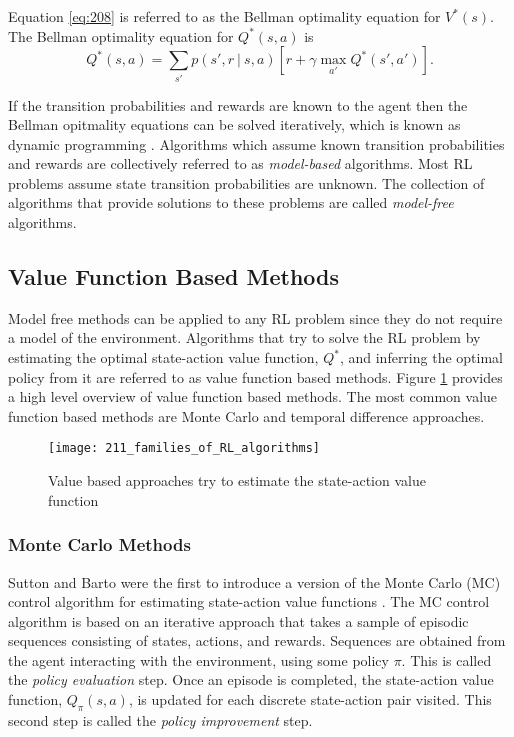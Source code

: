 Equation \ref{eq:208} is referred to as the Bellman optimality equation for $V^*(s)$. The Bellman optimality equation for $Q^*(s,a)$ is
\begin{equation}
	Q^*(s,a) = \sum_{s'} p(s', r \ | \ s, a)[r + \gamma \max_{a'} Q^*(s',a')]. \label{eq:209}
\end{equation}

If the transition probabilities and rewards are known to the agent then the Bellman opitmality equations can be solved iteratively, which is known as dynamic programming \cite{Bellm1957}. Algorithms which assume known transition probabilities and rewards are collectively referred to as \textit{model-based} algorithms. Most RL problems assume state transition probabilities are unknown. The collection of algorithms that provide solutions to these problems are called \textit{model-free} algorithms.


\subsection{Value Function Based Methods}
Model free methods can be applied to any RL problem since they do not require a model of the environment. Algorithms that try to solve the RL problem by estimating the optimal state-action value function, $Q^*$, and inferring the optimal policy from it are referred to as value function based methods. Figure \ref{fig:211_families_of_RL_algorithms} provides a high level overview of value function based methods. The most common value function based methods are Monte Carlo and temporal difference approaches.

\begin{figure}[h]
	\centering
	\texttt{[image: 211\_families\_of\_RL\_algorithms]}
	\caption[RL approaches: Value Based]{Value based approaches try to estimate the state-action value function}
	\label{fig:211_families_of_RL_algorithms}
\end{figure}


\subsubsection{Monte Carlo Methods}
Sutton and Barto were the first to introduce a version of the Monte Carlo (MC) control algorithm for estimating state-action value functions \cite{Sutton2018}. The MC control algorithm is based on an iterative approach that takes a sample of episodic sequences consisting of states, actions, and rewards. Sequences are obtained from the agent interacting with the environment, using some policy $\pi$. This is called the \textit{policy evaluation} step. Once an episode is completed, the state-action value function, $Q_{\pi}(s,a)$, is updated for each discrete state-action pair visited. This second step is called the \textit{policy improvement} step.

